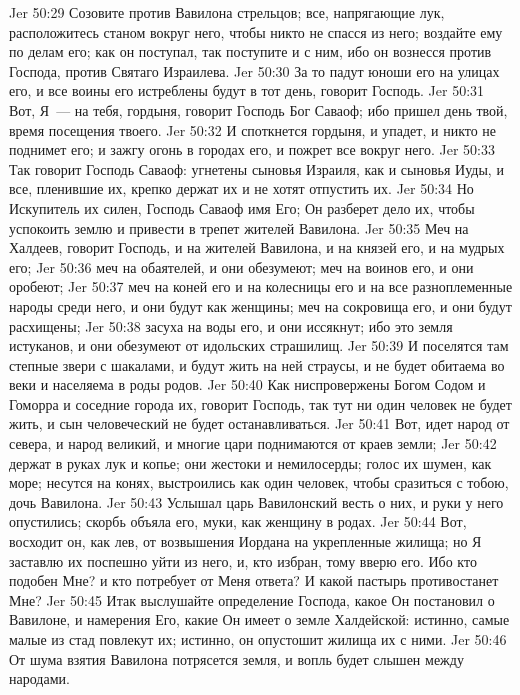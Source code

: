 \vs Jer 50:29 Созовите против Вавилона стрельцов; все, напрягающие лук, расположитесь станом вокруг него, чтобы никто не спасся из него; воздайте ему по делам его; как он поступал, так поступите и с ним, ибо он вознесся против Господа, против Святаго Израилева.
\vs Jer 50:30 За то падут юноши его на улицах его, и все воины его истреблены будут в тот день, говорит Господь.
\vs Jer 50:31 Вот, Я~--- на тебя, гордыня, говорит Господь Бог Саваоф; ибо пришел день твой, время посещения твоего.
\vs Jer 50:32 И споткнется гордыня, и упадет, и никто не поднимет его; и зажгу огонь в городах его, и пожрет все вокруг него.
\rsbpar\vs Jer 50:33 Так говорит Господь Саваоф: угнетены сыновья Израиля, как и сыновья Иуды, и все, пленившие их, крепко держат их и не хотят отпустить их.
\vs Jer 50:34 Но Искупитель их силен, Господь Саваоф имя Его; Он разберет дело их, чтобы успокоить землю и привести в трепет жителей Вавилона.
\vs Jer 50:35 Меч на Халдеев, говорит Господь, и на жителей Вавилона, и на князей его, и на мудрых его;
\vs Jer 50:36 меч на обаятелей, и они обезумеют; меч на воинов его, и они оробеют;
\vs Jer 50:37 меч на коней его и на колесницы его и на все разноплеменные народы среди него, и они будут как женщины; меч на сокровища его, и они будут расхищены;
\vs Jer 50:38 засуха на воды его, и они иссякнут; ибо это земля истуканов, и они обезумеют от идольских страшилищ.
\vs Jer 50:39 И поселятся там степные звери с шакалами, и будут жить на ней страусы, и не будет обитаема во веки и населяема в роды родов.
\vs Jer 50:40 Как ниспровержены Богом Содом и Гоморра и соседние города их, говорит Господь, так  тут ни один человек не будет жить, и сын человеческий не будет останавливаться.
\vs Jer 50:41 Вот, идет народ от севера, и народ великий, и многие цари поднимаются от краев земли;
\vs Jer 50:42 держат в руках лук и копье; они жестоки и немилосерды; голос их шумен, как море; несутся на конях, выстроились как один человек, чтобы сразиться с тобою, дочь Вавилона.
\vs Jer 50:43 Услышал царь Вавилонский весть о них, и руки у него опустились; скорбь объяла его, муки, как женщину в родах.
\vs Jer 50:44 Вот, восходит он, как лев, от возвышения Иордана на укрепленные жилища; но Я заставлю их поспешно уйти из него, и, кто избран, тому вверю его. Ибо кто подобен Мне? и кто потребует от Меня ответа? И какой пастырь противостанет Мне?
\vs Jer 50:45 Итак выслушайте определение Господа, какое Он постановил о Вавилоне, и намерения Его, какие Он имеет о земле Халдейской: истинно, самые малые из стад повлекут их; истинно, он опустошит жилища их с ними.
\vs Jer 50:46 От шума взятия Вавилона потрясется земля, и вопль будет слышен между народами.
